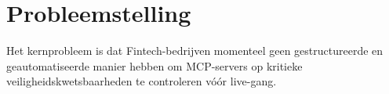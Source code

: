%
%
%
%
%


\section{Probleemstelling}
\label{voorstel:sec:probleemstelling}

Het kernprobleem is dat Fintech-bedrijven momenteel geen gestructureerde en geautomatiseerde manier hebben om MCP-servers op kritieke veiligheidskwetsbaarheden te controleren vóór live-gang.

